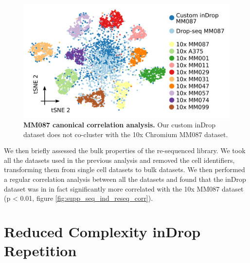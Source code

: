 \begin{figure}[ht]
\centerfloat
\includegraphics[width=\textwidth]{./ims/seq_cca.png}
\caption[MM087 canonical correlation analysis]{\textbf{MM087 canonical correlation analysis.} Our custom inDrop dataset does not co-cluster with the 10x Chromium MM087 dataset.}
\label{fig:seq_cca}
\end{figure}

We then briefly assessed the bulk properties of the re-sequenced library. We took all the datasets used in the previous analysis and removed the cell identifiers, transforming them from single cell datasets to bulk datasets. We then performed a regular correlation analysis between all the datasets and found that the inDrop dataset was in in fact significantly more correlated with the 10x MM087 dataset (p < 0.01, figure \ref{fig:supp_seq_ind_reseq_corr}).\pms


\clearpage
\section{Reduced Complexity inDrop Repetition}

